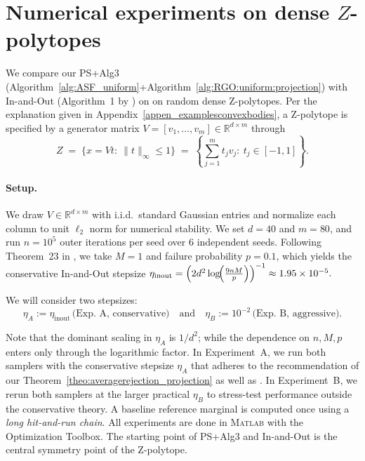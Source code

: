 \documentclass[11pt,letterpaper]{article}
\newcommand{\brac}[1]{\left( #1\right)}
\begin{document}
\section{Numerical experiments on dense $Z$-polytopes}
\label{section:numerical}

We compare our PS+Alg3 (Algorithm~\ref{alg:ASF_uniform}+Algorithm~\ref{alg:RGO:uniform:projection}) with In-and-Out (Algorithm~1 by  \cite{kook2024inandout}) on on random dense Z-polytopes. Per the explanation given in Appendix~\ref{appen_examplesconvexbodies}, a Z-polytope is specified by a generator matrix 
$V=[v_1,\dots,v_{m}]\in\mathbb{R}^{d\times m}$ through 
\[
Z \;=\;\{x=Vt:\ \|t\|_\infty\le 1\}
\;=\;\left\{\sum_{j=1}^{m} t_j v_j:\ t_j\in[-1,1]\right\}.
\]

\paragraph*{Setup.}
We draw $V\in\mathbb{R}^{d\times m}$ with i.i.d.\ standard Gaussian entries and
normalize each column to unit $\ell_2$ norm for numerical stability. We set
$d=40$ and $m=80$, and run $n=10^5$ outer iterations
per seed over $6$ independent seeds. Following Theorem~23 in
\cite{kook2024inandout}, we take $M=1$ and failure probability $p=0.1$,
which yields the conservative In-and-Out stepsize $\eta_{\mathrm{inout}}
=\brac{2d^{2} \log\!\Bigl(\frac{9  n  M}
{p}\Bigr)}^{-1}
\approx 1.95\times 10^{-5}.$

We will consider two stepsizes: 
\[
\eta_A := \eta_{\mathrm{inout}}\, \text{(Exp. A, conservative)} \quad\text{and}\quad \eta_B := 10^{-2}\, \text{(Exp. B, aggressive)}. 
\]

Note that the dominant scaling in $\eta_A$ is $1/d^2$; while the dependence on $n,M,p$ enters only through the logarithmic factor. In Experiment~A, we run both samplers with the conservative stepsize
$\eta_A$ that adheres to the recommendation of our Theorem~\ref{theo:averagerejection_projection} as well as  \cite[Theorem 23]{kook2024inandout} . In Experiment~B, we rerun both samplers at the larger practical $\eta_B$ to stress-test performance outside the conservative theory.
A baseline reference marginal is computed
once using a \emph{long hit-and-run chain}. All experiments are done in
\textsc{Matlab} with the Optimization Toolbox. The starting point of PS+Alg3 and In-and-Out is the central symmetry point of the Z-polytope. 
\end{document}
